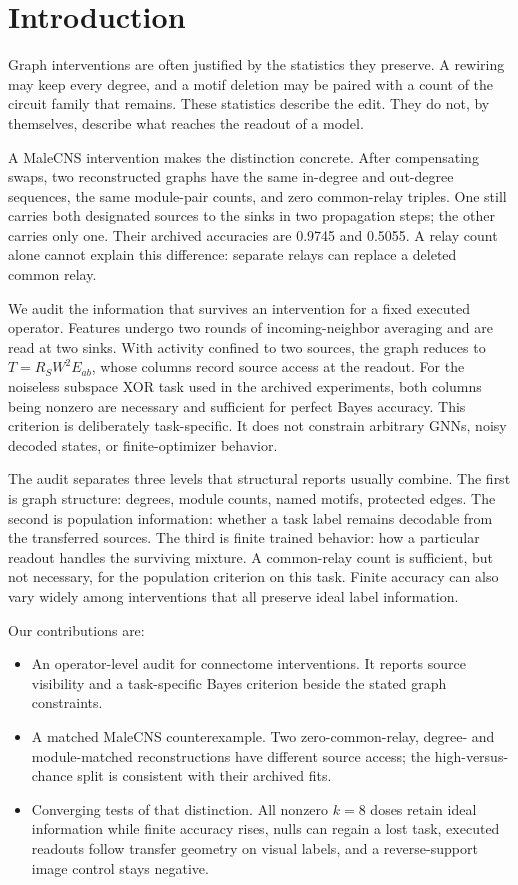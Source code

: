\section{Introduction}
\label{sec:introduction}

Graph interventions are often justified by the statistics they preserve.
A rewiring may keep every degree, and a motif deletion may be paired with a
count of the circuit family that remains. These statistics describe the edit.
They do not, by themselves, describe what reaches the readout of a model.

A MaleCNS intervention makes the distinction concrete. After compensating
swaps, two reconstructed graphs have the same in-degree and out-degree
sequences, the same module-pair counts, and zero common-relay triples. One
still carries both designated sources to the sinks in two propagation steps;
the other carries only one. Their archived accuracies are 0.9745 and 0.5055.
A relay count alone cannot explain this difference: separate relays can
replace a deleted common relay.

We audit the information that survives an intervention for a fixed executed
operator. Features undergo two rounds of incoming-neighbor averaging and are
read at two sinks. With activity confined to two sources, the graph reduces to
$T=R_SW^2E_{ab}$, whose columns record source access at the readout. For the
noiseless subspace XOR task used in the archived experiments, both columns
being nonzero are necessary and sufficient for perfect Bayes accuracy. This
criterion is deliberately task-specific. It does not constrain arbitrary
GNNs, noisy decoded states, or finite-optimizer behavior.

The audit separates three levels that structural reports usually combine.
The first is graph structure: degrees, module counts, named motifs, protected
edges. The second is population information: whether a task label remains
decodable from the transferred sources. The third is finite trained behavior:
how a particular readout handles the surviving mixture. A common-relay count
is sufficient, but not necessary, for the population criterion on this task.
Finite accuracy can also vary widely among interventions that all preserve
ideal label information.

Our contributions are:
\begin{itemize}
  \item An operator-level audit for connectome interventions. It reports
        source visibility and a task-specific Bayes criterion beside the
        stated graph constraints.
  \item A matched MaleCNS counterexample. Two zero-common-relay, degree- and
        module-matched reconstructions have different source access; the
        high-versus-chance split is consistent with their archived fits.
  \item Converging tests of that distinction.
        All nonzero $k=8$ doses retain ideal information while finite accuracy
        rises, nulls can regain a lost task, executed readouts follow transfer
        geometry on visual labels, and a reverse-support image control stays
        negative.
\end{itemize}
